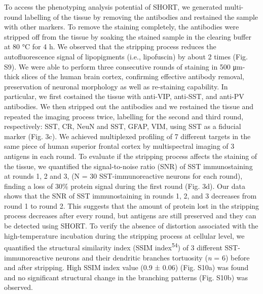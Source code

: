 \documentclass{article}
\begin{document}
To access the phenotyping analysis potential of SHORT, we generated multi-round labelling of the tissue by removing the antibodies and restained the sample with other markers. To remove the staining completely, the antibodies were stripped off from the tissue by soaking the stained sample in the clearing buffer at 80 °C for 4 h. We observed that the stripping process reduces the autofluorescence signal of lipopigments (i.e., lipofuscin) by about 2 times (Fig. S9). We were able to perform three consecutive rounds of staining in 500 μm-thick slices of the human brain cortex, confirming effective antibody removal, preservation of neuronal morphology as well as re-staining capability. In particular, we first costained the tissue with anti-VIP, anti-SST, and anti-PV antibodies. We then stripped out the antibodies and we restained the tissue and repeated the imaging process twice, labelling for the second and third round, respectively: SST, CR, NeuN and SST, GFAP, VIM, using SST as a fiducial marker (Fig. 3c). We achieved multiplexed profiling of 7 different targets in the same piece of human superior frontal cortex by multispectral imaging of 3 antigens in each round. To evaluate if the stripping process affects the staining of the tissue, we quantified the signal-to-noise ratio (SNR) of SST immunostaining at rounds 1, 2 and 3, (N = 30 SST-immunoreactive neurons for each round), finding a loss of 30\% protein signal during the first round (Fig. 3d). Our data shows that the SNR of SST immunostaining in rounds 1, 2, and 3 decreases from round 1 to round 2. This suggests that the amount of protein lost in the stripping process decreases after every round, but antigens are still preserved and they can be detected using SHORT. To verify the absence of distortion associated with the high-temperature incubation during the stripping process at cellular level, we quantified the structural similarity index (SSIM index\textsuperscript{54}) of 3 different SST-immunoreactive neurons and their dendritic branches tortuosity (\emph{n} = 6) before and after stripping. High SSIM index value (0.9 ± 0.06) (Fig. S10a) was found and no significant structural change in the branching patterns (Fig. S10b) was observed.
\end{document}
